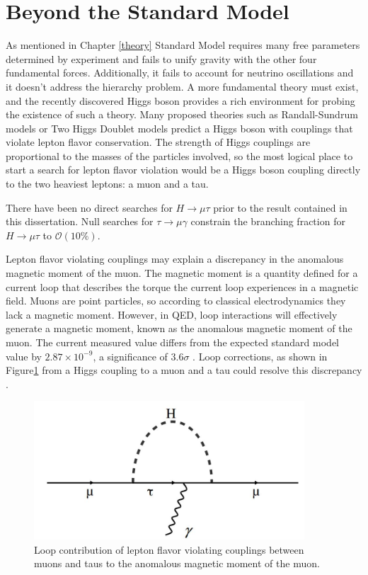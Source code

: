 \documentclass[oneside, letterpaper, oldfontcommands]{memoir}
\begin{document}
\section{Beyond the Standard Model}

\qquad As mentioned in Chapter \ref{theory} Standard Model requires many free parameters determined by experiment and fails to unify gravity with the other four fundamental forces. Additionally, it fails to account for neutrino oscillations\cite{Fukuda:1998mi}\cite{Ahmad:2001an}\cite{Ahmad:2002jz} and it doesn't address the hierarchy problem. \cite{ArkaniHamed:1998rs} A more fundamental theory must exist, and the recently discovered Higgs boson provides a rich environment for probing the existence of such a theory. Many proposed theories such as Randall-Sundrum models \cite{Randall:1999ee} or Two Higgs Doublet models \cite{Branco:2011iw} predict a Higgs boson with couplings that violate lepton flavor conservation. The strength of Higgs couplings are proportional to the masses of the particles involved, so the most logical place to start a search for lepton flavor violation would be a Higgs boson coupling directly to the two heaviest leptons: a muon and a tau.

\qquad There have been no direct searches for $H \rightarrow \mu\tau$ prior to the result contained in this dissertation. Null searches for $\tau \rightarrow \mu\gamma$ constrain the branching fraction for $H \rightarrow \mu\tau$ to $\mathcal{O}(10\%)$.\cite{Harnik:2012pb}

\qquad Lepton flavor violating couplings may explain a discrepancy in the anomalous magnetic moment of the muon. The magnetic moment is a quantity defined for a current loop that describes the torque the current loop experiences in a magnetic field. Muons are point particles, so according to classical electrodynamics they lack a magnetic moment. However, in QED, loop interactions will effectively generate a magnetic moment, known as the anomalous magnetic moment of the muon. The current measured value differs from the expected standard model value by $2.87 \times 10^{-9}$, a significance of $3.6 \sigma$ \cite{Bennett:2004pv}\cite{Agashe:2014kda}. Loop corrections, as shown in Figure\ref{fig:mutauloop} from a Higgs coupling to a muon and a tau could resolve this discrepancy \cite{Harnik:2012pb}.

\begin{figure}[here]
\includegraphics[width=0.9\textwidth]{mutauloop.jpg}
\caption{Loop contribution of lepton flavor violating couplings between muons and taus to the anomalous magnetic moment of the muon.}
\label{fig:mutauloop}
\end{figure}
\end{document}
